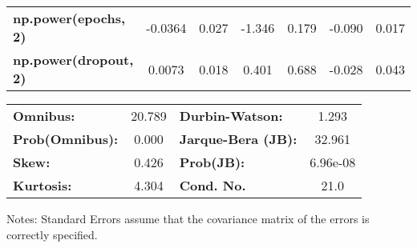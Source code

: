 \begin{center}
\begin{tabular}{lcccccc}
\textbf{np.power(epochs, 2)}         &      -0.0364  &        0.027     &    -1.346  &         0.179        &       -0.090    &        0.017     \\
\textbf{np.power(dropout, 2)}        &       0.0073  &        0.018     &     0.401  &         0.688        &       -0.028    &        0.043     \\
\bottomrule
\end{tabular}
\begin{tabular}{lclc}
\textbf{Omnibus:}       & 20.789 & \textbf{  Durbin-Watson:     } &    1.293  \\
\textbf{Prob(Omnibus):} &  0.000 & \textbf{  Jarque-Bera (JB):  } &   32.961  \\
\textbf{Skew:}          &  0.426 & \textbf{  Prob(JB):          } & 6.96e-08  \\
\textbf{Kurtosis:}      &  4.304 & \textbf{  Cond. No.          } &     21.0  \\
\bottomrule
\end{tabular}
\end{center}

Notes: \newline
 [1] Standard Errors assume that the covariance matrix of the errors is correctly specified.